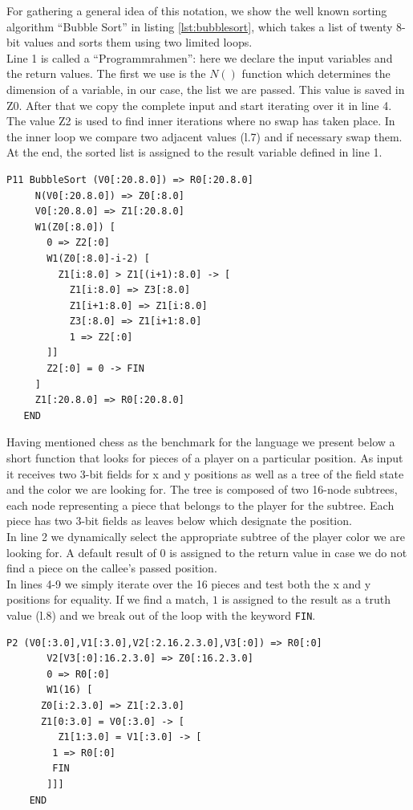 \documentclass{llncs}
\begin{document}
 For gathering a general idea of this notation, we show the well known sorting algorithm 
 ``Bubble Sort'' in listing \ref{lst:bubblesort}, 
 which takes a list of twenty 8-bit values and sorts them using two limited loops. \\
 Line 1 is called a ``Programmrahmen'': here we declare the input variables and the return values. 
 The first we use is the $N()$ function which determines the dimension of a variable, in our case, 
 the list we are passed. This value is saved in Z0. After that we copy the complete input and 
 start iterating over it in line 4. The value Z2 is used to find inner iterations where no swap has taken place.
 In the inner loop we compare two adjacent values (l.7) and if necessary swap them.
 At the end, the sorted list is assigned to the result variable defined in line 1.
\pagebreak[4]
 \begin{lstlisting}[caption=Bubble Sort in Linearized Plan Calculus Notation,label={lst:bubblesort}]
   P11 BubbleSort (V0[:20.8.0]) => R0[:20.8.0]
     N(V0[:20.8.0]) => Z0[:8.0]
     V0[:20.8.0] => Z1[:20.8.0]
     W1(Z0[:8.0]) [
       0 => Z2[:0]
       W1(Z0[:8.0]-i-2) [
         Z1[i:8.0] > Z1[(i+1):8.0] -> [
           Z1[i:8.0] => Z3[:8.0]
           Z1[i+1:8.0] => Z1[i:8.0]
           Z3[:8.0] => Z1[i+1:8.0]
           1 => Z2[:0]
       ]]
       Z2[:0] = 0 -> FIN
     ]
     Z1[:20.8.0] => R0[:20.8.0]
   END
 \end{lstlisting}

 Having mentioned chess as the benchmark for the language we present below 
 a short function that looks for pieces of a player on a particular position.
 As input it receives two 3-bit fields for x and y positions as well as a tree
 of the field state and the color we are looking for.
 The tree is composed of two 16-node subtrees, each node representing a piece 
 that belongs to the player for the subtree. Each piece has two 3-bit fields 
 as leaves below which designate the position.\\
 In line 2 we dynamically select the appropriate subtree of the player color 
 we are looking for. A default result of $0$ is assigned to the return value 
 in case we do not find a piece on the callee's passed position.\\
 In lines 4-9 we simply iterate over the 16 pieces and test both the 
 x and y positions for equality. If we find a match, $1$ is assigned to the 
 result as a truth value (l.8) and we break out of the loop with the keyword {\tt FIN}.
 \begin{lstlisting}[caption=Selecting from a chess field,label={lst:chess}]
    P2 (V0[:3.0],V1[:3.0],V2[:2.16.2.3.0],V3[:0]) => R0[:0]
       V2[V3[:0]:16.2.3.0] => Z0[:16.2.3.0]
       0 => R0[:0]
       W1(16) [
	  Z0[i:2.3.0] => Z1[:2.3.0]
	  Z1[0:3.0] = V0[:3.0] -> [
	     Z1[1:3.0] = V1[:3.0] -> [
		1 => R0[:0]
		FIN
       ]]]
    END
 \end{lstlisting}
\end{document}
